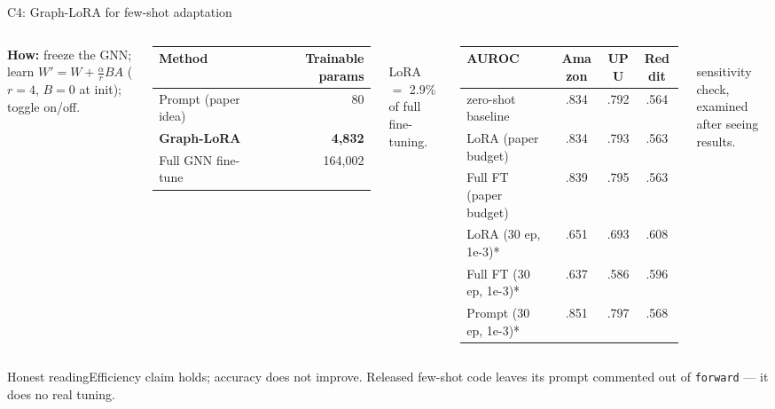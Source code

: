 \documentclass[aspectratio=169,11pt]{beamer}
\begin{document}
\begin{frame}{C4: Graph-LoRA for few-shot adaptation}
\begin{columns}[T]
\textbf{How:} freeze the GNN; learn $W'=W+\tfrac{\alpha}{r}BA$ ($r{=}4$, $B{=}0$ at init); toggle on/off.\\[6pt]
\small
\begin{tabular}{lr}
\toprule
Method & Trainable params\\ \midrule
Prompt (paper idea) & 80\\
\textbf{Graph-LoRA} & \textbf{4,832}\\
Full GNN fine-tune & 164,002\\ \bottomrule
\end{tabular}\\[4pt]
\textcolor{good}{LoRA $=$ 2.9\% of full fine-tuning.}
\footnotesize
\begin{tabular}{lccc}
\toprule
AUROC & Amazon & UPU & Reddit\\ \midrule
zero-shot baseline & .834 & .792 & .564\\
LoRA (paper budget) & .834 & .793 & .563\\
Full FT (paper budget) & .839 & .795 & .563\\
LoRA (30 ep, 1e-3)* & .651 & .693 & .608\\
Full FT (30 ep, 1e-3)* & .637 & .586 & .596\\
Prompt (30 ep, 1e-3)* & .851 & .797 & .568\\ \bottomrule
\end{tabular}\\[2pt]
\scriptsize *sensitivity check, examined after seeing results.
\end{columns}
\vspace{2pt}
\begin{alertblock}{Honest reading}\footnotesize Efficiency claim holds; accuracy does not improve. Released few-shot code leaves its prompt commented out of \texttt{forward} --- it does no real tuning.\end{alertblock}
\end{frame}
\end{document}
